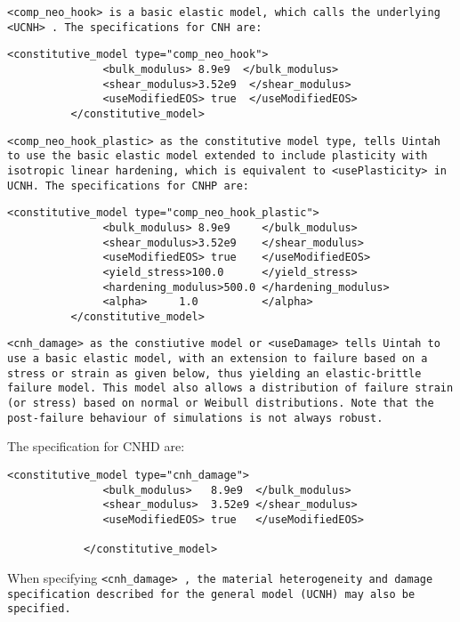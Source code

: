 \begin{enumerate}
\tt <comp\_neo\_hook> \normalfont is a basic elastic model, which calls the underlying \tt <UCNH> \normalfont .
The specifications for CNH are:

\begin{Verbatim}[fontsize=\footnotesize]
          <constitutive_model type="comp_neo_hook">
               <bulk_modulus> 8.9e9  </bulk_modulus>
               <shear_modulus>3.52e9  </shear_modulus>
               <useModifiedEOS> true  </useModifiedEOS>
          </constitutive_model>
\end{Verbatim}

\tt <comp\_neo\_hook\_plastic> \normalfont as the constitutive model type,
 tells Uintah to use the basic elastic model extended
to include plasticity with isotropic linear hardening, 
which is equivalent to \tt <usePlasticity> \normalfont in UCNH.
The specifications for CNHP are:

\begin{Verbatim}[fontsize=\footnotesize]
          <constitutive_model type="comp_neo_hook_plastic">
               <bulk_modulus> 8.9e9     </bulk_modulus>
               <shear_modulus>3.52e9    </shear_modulus>
               <useModifiedEOS> true    </useModifiedEOS>
               <yield_stress>100.0      </yield_stress>
               <hardening_modulus>500.0 </hardening_modulus>
               <alpha>     1.0          </alpha>
          </constitutive_model>
\end{Verbatim}


\tt <cnh\_damage> \normalfont as the constiutive model or \tt <useDamage> \normalfont 
tells Uintah to use a basic elastic model, with an extension
to failure based on a stress or strain as given below, thus yielding an
elastic-brittle failure model.  This model also allows a distribution
of failure strain (or stress) based on normal or Weibull distributions.
Note that the post-failure behaviour of simulations is not always robust.

The specification for CNHD are:

\begin{Verbatim}[fontsize=\footnotesize]
            <constitutive_model type="cnh_damage"> 
               <bulk_modulus>   8.9e9  </bulk_modulus>
               <shear_modulus>  3.52e9 </shear_modulus>
               <useModifiedEOS> true   </useModifiedEOS>
                
            </constitutive_model>
\end{Verbatim}

When specifying \tt <cnh\_damage> \normalfont, the material heterogeneity and damage 
specification described for the general model (UCNH) may also be specified.


\end{enumerate}
